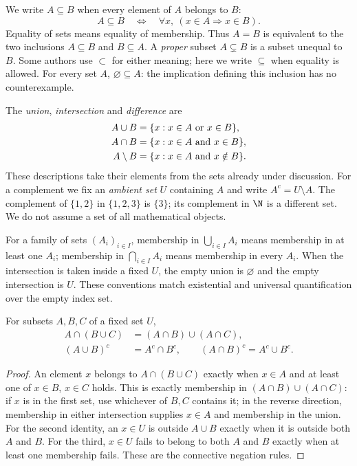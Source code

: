 We write $A\subseteq B$ when every element of $A$ belongs to $B$:
\[
A\subseteq B\quad\Longleftrightarrow\quad
\forall x,\ (x\in A\Rightarrow x\in B).
\]
Equality of sets means equality of membership. Thus $A=B$ is equivalent to the two
inclusions $A\subseteq B$ and $B\subseteq A$. A \emph{proper} subset $A\subsetneq B$
is a subset unequal to $B$. Some authors use $\subset$ for either meaning; here we
write $\subseteq$ when equality is allowed. For every set $A$, $\varnothing\subseteq A$:
the implication defining this inclusion has no counterexample.

The \emph{union}, \emph{intersection} and \emph{difference} are
\[
\begin{aligned}
A\cup B&=\{x:x\in A\ \hbox{or}\ x\in B\},\\
A\cap B&=\{x:x\in A\ \hbox{and}\ x\in B\},\\
A\setminus B&=\{x:x\in A\ \hbox{and}\ x\notin B\}.
\end{aligned}
\]
These descriptions take their elements from the sets already under discussion.
For a complement we fix an \emph{ambient set} $U$ containing $A$ and write
$A^c=U\setminus A$. The complement of $\{1,2\}$ in $\{1,2,3\}$ is $\{3\}$;
its complement in $\N$ is a different set. We do not assume a set of all mathematical objects.

For a family of sets $(A_i)_{i\in I}$, membership in $\bigcup_{i\in I}A_i$ means
membership in at least one $A_i$; membership in $\bigcap_{i\in I}A_i$ means membership
in every $A_i$. When the intersection is taken inside a fixed $U$, the empty union
is $\varnothing$ and the empty intersection is $U$. These conventions match
existential and universal quantification over the empty index set.

\begin{proposition}\label{prop:lang-sets}
For subsets $A,B,C$ of a fixed set $U$,
\[
\begin{aligned}
A\cap(B\cup C)&=(A\cap B)\cup(A\cap C),\\
(A\cup B)^c&=A^c\cap B^c,\qquad
(A\cap B)^c=A^c\cup B^c.
\end{aligned}
\]
\end{proposition}
\begin{proof}
An element $x$ belongs to $A\cap(B\cup C)$ exactly when $x\in A$ and at least
one of $x\in B$, $x\in C$ holds. This is exactly membership in $(A\cap B)\cup(A\cap C)$:
if $x$ is in the first set, use whichever of $B,C$ contains it; in the reverse direction,
membership in either intersection supplies $x\in A$ and membership in the union.
For the second identity, an $x\in U$ is outside $A\cup B$ exactly when it is outside
both $A$ and $B$. For the third, $x\in U$ fails to belong to both $A$ and $B$
exactly when at least one membership fails. These are the connective negation rules.
\end{proof}


